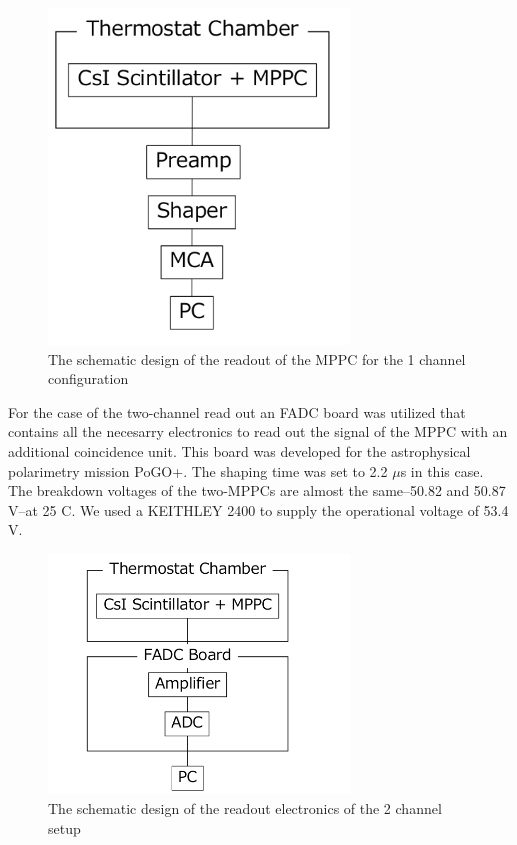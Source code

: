 \documentclass[12pt, a4paper,titlepage]{article}
\numberwithin{equation}{section}
\numberwithin{figure}{section}
\begin{document}
\begin{figure}
\begin{center}
\includegraphics[width=80.0mm]{images/1channelelectronics.png}
\caption{The schematic design of the readout of the MPPC for the 1 channel configuration}
\label{fig:el1ch}
\end{center}
\end{figure}

For the case of the two-channel read out an FADC board was utilized that contains all the necesarry electronics to read out the signal of the MPPC with an additional coincidence unit. This board was developed for the astrophysical polarimetry mission PoGO+. The shaping time was set to 2.2 $\mu$s in this case. The breakdown voltages of the two-MPPCs are almost the same–50.82 and 50.87 V–at 25 C. We used a KEITHLEY 2400 to supply the operational voltage of 53.4 V.

\begin{figure}[h!]
\centering
\includegraphics[width=80.0mm]{images/2channelelectronics.png}
\caption{The schematic design of the readout electronics of the 2 channel setup}
\end{figure}
\end{document}
